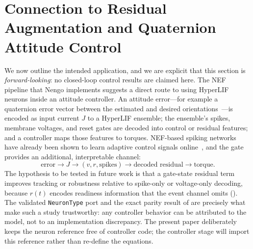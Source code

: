 \documentclass[journal]{IEEEtran}
\newcommand{\code}[1]{\texttt{#1}}
\begin{document}
\section{Connection to Residual Augmentation and Quaternion Attitude Control}
\label{sec:bridge}
We now outline the intended application, and we are explicit that this section
is \emph{forward-looking}: no closed-loop control results are claimed here. The
NEF pipeline that Nengo implements suggests a direct route to using HyperLIF
neurons inside an attitude controller. An attitude error---for example a
quaternion error vector between the estimated and desired
orientations~\cite{markley2014attitude}---is encoded as input current $J$ to a
HyperLIF ensemble; the ensemble's spikes, membrane voltages, and reset gates are
decoded into control or residual features; and a controller maps those features
to torques. NEF-based spiking networks have already been shown to learn adaptive
control signals online~\cite{dewolf2016reach}, and the gate provides an
additional, interpretable channel:
\begin{equation}
  \text{error} \to J \to (v, r, \text{spikes}) \to \text{decoded residual} \to \text{torque}.
  \label{eq:pipeline}
\end{equation}
The hypothesis to be tested in future work is that a gate-state residual term
improves tracking or robustness relative to spike-only or voltage-only decoding,
because $r(t)$ encodes readiness information that the event channel omits
(). The validated \code{NeuronType} port and the exact
parity result of  are precisely what make such a study
trustworthy: any controller behavior can be attributed to the model, not to an
implementation discrepancy. The present paper deliberately keeps the neuron
reference free of controller code; the controller stage will import this
reference rather than re-define the equations.

\end{document}
